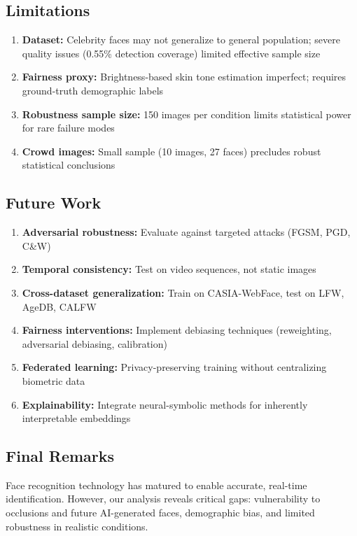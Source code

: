 \documentclass[11pt,a4paper]{article}
\begin{document}
\subsection{Limitations}

\begin{enumerate}
    \item \textbf{Dataset:} Celebrity faces may not generalize to general population; severe quality issues (0.55\% detection coverage) limited effective sample size
    \item \textbf{Fairness proxy:} Brightness-based skin tone estimation imperfect; requires ground-truth demographic labels
    \item \textbf{Robustness sample size:} 150 images per condition limits statistical power for rare failure modes
    \item \textbf{Crowd images:} Small sample (10 images, 27 faces) precludes robust statistical conclusions
\end{enumerate}

\subsection{Future Work}

\begin{enumerate}
    \item \textbf{Adversarial robustness:} Evaluate against targeted attacks (FGSM, PGD, C\&W)
    \item \textbf{Temporal consistency:} Test on video sequences, not static images
    \item \textbf{Cross-dataset generalization:} Train on CASIA-WebFace, test on LFW, AgeDB, CALFW
    \item \textbf{Fairness interventions:} Implement debiasing techniques (reweighting, adversarial debiasing, calibration)
    \item \textbf{Federated learning:} Privacy-preserving training without centralizing biometric data
    \item \textbf{Explainability:} Integrate neural-symbolic methods for inherently interpretable embeddings
\end{enumerate}

\subsection{Final Remarks}

Face recognition technology has matured to enable accurate, real-time identification. However, our analysis reveals critical gaps: vulnerability to occlusions and future AI-generated faces, demographic bias, and limited robustness in realistic conditions.
\end{document}
